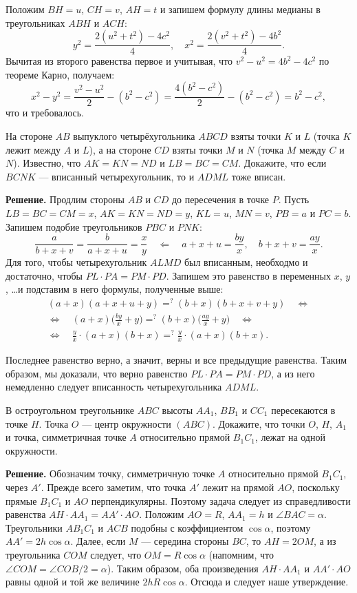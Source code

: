 Положим $BH=u$, $CH=v$, $AH=t$ и запишем формулу длины медианы в треугольниках $ABH$ и $ACH$: $$y^2=\frac{2(u^2+t^2)-4c^2}{4}, \quad x^2=\frac{2(v^2+t^2)-4b^2}{4}.$$ Вычитая из второго равенства первое и учитывая, что $v^2-u^2=4b^2-4c^2$ по теореме Карно, получаем: $$x^2-y^2=\frac{v^2-u^2}{2}-(b^2-c^2)=\frac{4(b^2-c^2)}{2}-(b^2-c^2)=b^2-c^2,$$ что и требовалось.

 На стороне $AB$ выпуклого четырёхугольника $ABCD$ взяты точки $K$ и $L$ (точка $K$ лежит между $A$ и $L$), а на стороне $CD$ взяты точки $M$ и $N$ (точка $M$ между $C$ и $N$). Известно, что $AK=KN=ND$ и $LB=BC=CM$. Докажите, что если $BCNK$ --- вписанный четырехугольник, то и $ADML$ тоже вписан.

\textbf{Решение.} Продлим стороны $AB$ и $CD$ до пересечения в точке $P$. Пусть $LB=BC=CM=x$, $AK=KN=ND=y$, $KL=u$, $MN=v$, $PB=a$ и $PC=b$. Запишем подобие треугольников $PBC$ и $PNK$: $$\frac{a}{b+x+v}=\frac{b}{a+x+u}=\frac{x}{y}\quad\Longleftarrow\quad a+x+u=\frac{by}{x}, \quad b+x+v=\frac{ay}{x}.$$ Для того, чтобы четырехугольник $ALMD$ был вписанным, необходмо и достаточно, чтобы $PL\cdot PA=PM\cdot PD$. Запишем это равенство в переменных $x$, $y$, \ldots и подставим в него формулы, полученные выше:
\begin{multline*}
  (a+x)(a+x+u+y) =^? (b+x)(b+x+v+y)\quad\Longleftrightarrow \\ \Longleftrightarrow\quad (a+x)\Big(\frac{by}{x}+y\Big) =^? (b+x)\Big(\frac{ay}{x}+y\Big)  \quad\Longleftrightarrow \\ \Longleftrightarrow\quad \frac{y}{x}\cdot (a+x)(b+x) = ^?\frac{y}{x}\cdot (a+x)(b+x).
\end{multline*}

Последнее равенство верно, а значит, верны и все предыдущие равенства. Таким образом, мы доказали, что верно равенство $PL\cdot PA=PM\cdot PD$, а из него немедленно следует вписанность четырехугольника $ADML$.

 В остроугольном треугольнике $ABC$ высоты $AA_1$, $BB_1$ и $CC_1$ пересекаются в точке $H$. Точка $O$ --- центр окружности $(ABC)$. Докажите, что точки $O$, $H$, $A_1$ и точка, симметричная точке $A$ относительно прямой $B_1C_1$, лежат на одной окружности.

\textbf{Решение.} Обозначим точку, симметричную точке $A$ относительно прямой $B_1C_1$, через $A'$. Прежде всего заметим, что точка $A'$ лежит на прямой $AO$, поскольку прямые $B_1C_1$ и $AO$ перпендикулярны. Поэтому задача следует из справедливости равенства $AH\cdot AA_1=AA'\cdot AO$. Положим $AO=R$, $AA_1=h$ и $\angle BAC=\alpha$. Треугольники $AB_1C_1$ и $ACB$ подобны с коэффициентом $\cos\alpha$, поэтому $AA'=2h\cos\alpha$. Далее, если $M$ --- середина стороны $BC$, то $AH=2OM$, а из треугольника $COM$ следует, что $OM=R\cos\alpha$ (напомним, что $\angle COM=\angle COB/2=\alpha$). Таким образом, оба произведения $AH\cdot AA_1$ и $AA'\cdot AO$ равны одной и той же величине $2hR\cos\alpha$. Отсюда и следует наше утверждение.

